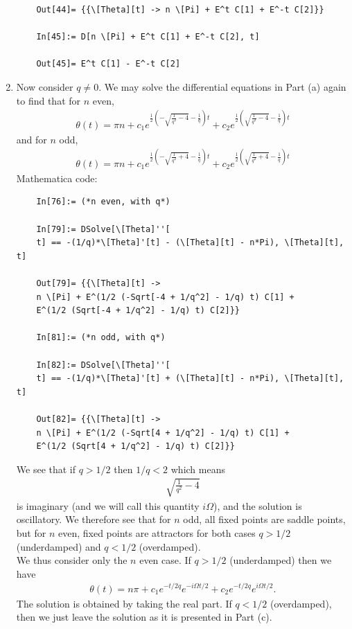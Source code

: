 \documentclass{article}
\theoremstyle{definition}
\begin{document}
\begin{enumerate}[label=(\alph*)]
\begin{lstlisting}
	Out[44]= {{\[Theta][t] -> n \[Pi] + E^t C[1] + E^-t C[2]}}
	
	In[45]:= D[n \[Pi] + E^t C[1] + E^-t C[2], t]
	
	Out[45]= E^t C[1] - E^-t C[2]
	\end{lstlisting}
	
	
	
	\item Now consider $q\neq 0$. We may solve the differential equations in Part (a) again to find that for $n$ even,
	\begin{align*}
	\theta(t) = \pi  n+c_1 e^{\frac{1}{2}
		\left(-\sqrt{\frac{1}{q^2}-4}-\frac{1}{q}\right) t}+c_2
	e^{\frac{1}{2} \left(\sqrt{\frac{1}{q^2}-4}-\frac{1}{q}\right) t}
	\end{align*}
	and for $n$ odd,
	\begin{align*}
	\theta(t) = \pi  n+c_1 e^{\frac{1}{2}
		\left(-\sqrt{\frac{1}{q^2}+4}-\frac{1}{q}\right) t}+c_2
	e^{\frac{1}{2} \left(\sqrt{\frac{1}{q^2}+4}-\frac{1}{q}\right) t}
	\end{align*}
	Mathematica code:
	\begin{lstlisting}
	In[76]:= (*n even, with q*)
	
	In[79]:= DSolve[\[Theta]''[
	t] == -(1/q)*\[Theta]'[t] - (\[Theta][t] - n*Pi), \[Theta][t], t]
	
	Out[79]= {{\[Theta][t] -> 
	n \[Pi] + E^(1/2 (-Sqrt[-4 + 1/q^2] - 1/q) t) C[1] + 
	E^(1/2 (Sqrt[-4 + 1/q^2] - 1/q) t) C[2]}}
	
	In[81]:= (*n odd, with q*)
	
	In[82]:= DSolve[\[Theta]''[
	t] == -(1/q)*\[Theta]'[t] + (\[Theta][t] - n*Pi), \[Theta][t], t]
	
	Out[82]= {{\[Theta][t] -> 
	n \[Pi] + E^(1/2 (-Sqrt[4 + 1/q^2] - 1/q) t) C[1] + 
	E^(1/2 (Sqrt[4 + 1/q^2] - 1/q) t) C[2]}}
	\end{lstlisting}
	
	We see that if $q > 1/2$ then $1/q < 2$ which means 
	\begin{align*}
	\sqrt{\frac{1}{q^2}-4} 
	\end{align*}
	is imaginary (and we will call this quantity $i\Omega$), and the solution is oscillatory. We therefore see that for $n$ odd, all fixed points are saddle points, but for $n$ even, fixed points are attractors for both cases $q > 1/2$ (underdamped) and $q < 1/2$ (overdamped).\\
	
	We thus consider only the $n$ even case.  If $q > 1/2$ (underdamped) then we have
	\begin{align*}
	\theta(t) = n\pi + c_1 e^{-t/2q} e^{-i\Omega t/2} + c_2 e^{-t/2q} e^{i\Omega t/2}.
	\end{align*}
	The solution is obtained by taking the real part. If $q < 1/2$ (overdamped), then we just leave the solution as it is presented in Part (c). 
	

\end{enumerate}
\end{document}
